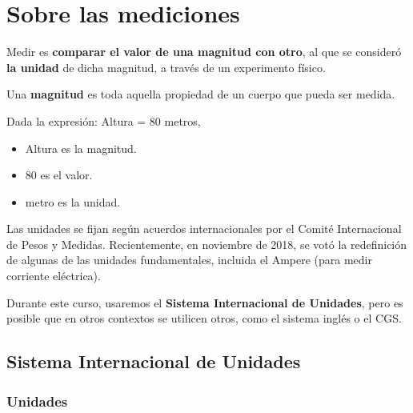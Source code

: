 \chapter{Sobre las mediciones}
Medir es \textbf{comparar el valor de una magnitud con otro}, al que se consideró \textbf{la unidad} de dicha magnitud, a través de un experimento físico.

Una \textbf{magnitud} es toda aquella propiedad de un cuerpo que pueda ser medida.

\begin{ejemplo}
	Dada la expresión: Altura = 80 metros,
	\begin{itemize}
		\item Altura es la magnitud.
		\item 80 es el valor.
		\item metro es la unidad.
	\end{itemize}
\end{ejemplo}

Las unidades se fijan según acuerdos internacionales por el Comité Internacional de Pesos y Medidas. Recientemente, en noviembre de 2018, se votó la redefinición de algunas de las unidades fundamentales, incluida el Ampere (para medir corriente eléctrica).

Durante este curso, usaremos el \textbf{Sistema Internacional de Unidades}, pero es posible que en otros contextos se utilicen otros, como el sistema inglés o el CGS.

\section{Sistema Internacional de Unidades}
\subsection{Unidades}

